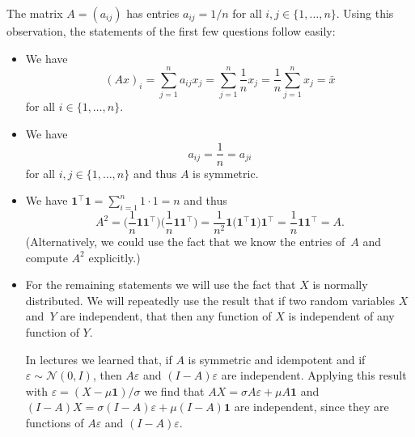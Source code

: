 \documentclass[
  a4paper,
]{article}
\theoremstyle{definition}
\theoremstyle{definition}
\theoremstyle{definition}
\theoremstyle{definition}
\theoremstyle{remark}
\begin{document}
\begin{myanswers}

The matrix \(A = (a_{ij})\) has entries \(a_{ij} = 1/n\) for all
\(i, j \in \{1, \ldots, n\}\). Using this observation, the statements
of the first few questions follow easily:

\begin{itemize}
\item
  We have
  \begin{equation*}
    (Ax)_i
    = \sum_{j=1}^n a_{ij} x_j
    = \sum_{j=1}^n \frac1n x_j
    = \frac1n \sum_{j=1}^n x_j
    = \bar x
  \end{equation*}
  for all \(i \in \{1, \ldots, n\}\).
\item
  We have
  \begin{equation*}
    a_{ij}
    = \frac1n
    = a_{ji}
  \end{equation*}
  for all \(i, j \in \{1, \ldots, n\}\) and thus \(A\) is symmetric.
\item
  We have
  \(\mathbf{1}^\top \mathbf{1} = \sum_{i=1}^n 1 \cdot 1 = n\) and
  thus
  \begin{equation*}
    A^2
    = \bigl( \frac1n \mathbf{1} \mathbf{1}^\top \bigr)
        \bigl( \frac1n \mathbf{1} \mathbf{1}^\top \bigr)
    = \frac{1}{n^2} \mathbf{1}
        \bigl(\mathbf{1}^\top\mathbf{1}\bigr) \mathbf{1}^\top
    = \frac1n \mathbf{1} \mathbf{1}^\top
    = A.
  \end{equation*}
  (Alternatively, we could use the fact that we know the entries
  of~\(A\) and compute \(A^2\) explicitly.)
\item
  For the remaining statements we will use the fact that \(X\) is
  normally distributed. We will repeatedly use the
  result that if two random variables \(X\) and~\(Y\) are independent,
  that then any function of \(X\) is independent of any function of
  \(Y\).

  In lectures we learned that, if \(A\) is symmetric and idempotent
  and if \(\varepsilon\sim \mathcal{N}(0, I)\), then \(A\varepsilon\) and \((I-A)\varepsilon\) are
  independent. Applying this result with
  \(\varepsilon= (X - \mu \mathbf{1}) / \sigma\) we
  find that \(AX = \sigma A\varepsilon+ \mu A \mathbf{1}\) and
  \((I-A)X = \sigma (I-A)\varepsilon+ \mu (I-A)\mathbf{1}\)
  are independent, since they are functions of \(A\varepsilon\) and \((I-A)\varepsilon\).


\end{itemize}
\end{myanswers}
\end{document}
